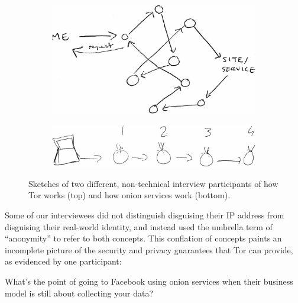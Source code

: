 \begin{figure}[t]
    \centering

    \begin{subfigure}[t]{\linewidth}
        \centering
        \includegraphics[width=0.8\linewidth]{figures/tor-sketch.jpg}
        \label{fig:tor-sketch}
    \end{subfigure}

    \begin{subfigure}[t]{\linewidth}
        \centering
        \includegraphics[width=0.8\linewidth]{figures/os-sketch.jpg}
        \label{fig:os-sketch}
    \end{subfigure}

    \caption{Sketches of two different, non-technical interview participants of
    how Tor works (top) and how onion services work (bottom).}
\end{figure}

Some of our interviewees did not distinguish disguising their IP address from
disguising their real-world identity, and instead used the umbrella term of
``anonymity'' to refer to both concepts.  This conflation of concepts paints an
incomplete picture of the security and privacy guarantees that Tor can provide,
as evidenced by one participant:

\begin{displayquote}
What's the point of going to Facebook using onion services when their business
model is still about collecting your data?
\end{displayquote}

